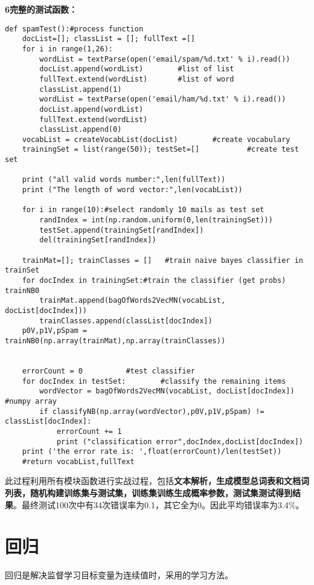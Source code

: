 \noindent\textbf{\textcircled{\footnotesize{6}}完整的测试函数：}
\begin{lstlisting}
def spamTest():#process function
    docList=[]; classList = []; fullText =[]
    for i in range(1,26):
        wordList = textParse(open('email/spam/%d.txt' % i).read())
        docList.append(wordList)        #list of list
        fullText.extend(wordList)       #list of word
        classList.append(1)
        wordList = textParse(open('email/ham/%d.txt' % i).read())
        docList.append(wordList)
        fullText.extend(wordList)
        classList.append(0)
    vocabList = createVocabList(docList)        #create vocabulary
    trainingSet = list(range(50)); testSet=[]           #create test set

    print ("all valid words number:",len(fullText))
    print ("The length of word vector:",len(vocabList))

    for i in range(10):#select randomly 10 mails as test set
        randIndex = int(np.random.uniform(0,len(trainingSet)))
        testSet.append(trainingSet[randIndex])
        del(trainingSet[randIndex])

    trainMat=[]; trainClasses = []   #train naive bayes classifier in trainSet
    for docIndex in trainingSet:#train the classifier (get probs) trainNB0
        trainMat.append(bagOfWords2VecMN(vocabList, docList[docIndex]))
        trainClasses.append(classList[docIndex])
    p0V,p1V,pSpam = trainNB0(np.array(trainMat),np.array(trainClasses))


    errorCount = 0          #test classifier
    for docIndex in testSet:        #classify the remaining items
        wordVector = bagOfWords2VecMN(vocabList, docList[docIndex])   #numpy array
        if classifyNB(np.array(wordVector),p0V,p1V,pSpam) != classList[docIndex]:
            errorCount += 1
            print ("classification error",docIndex,docList[docIndex])
    print ('the error rate is: ',float(errorCount)/len(testSet))
    #return vocabList,fullText
\end{lstlisting}

此过程利用所有模块函数进行实战过程，包括\textbf{文本解析，生成模型总词表和文档词列表，随机构建训练集与测试集，训练集训练生成概率参数，测试集测试得到结果}。最终测试100次中有34次错误率为0.1，其它全为0。因此平均错误率为3.4\%。







\newpage
\section{回归}
回归是解决监督学习目标变量为连续值时，采用的学习方法。

